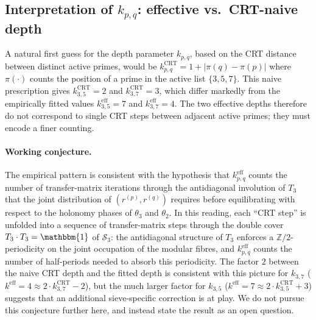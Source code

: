 \subsection{Interpretation of $k_{p,q}$: effective vs.\ CRT-naive depth}
\label{ssec:k_interpretation}

A natural first guess for the depth parameter $k_{p,q}$, based on the
CRT distance between distinct active primes, would be
$k^{\mathrm{CRT}}_{p,q} = 1 + |\pi(q) - \pi(p)|$ where
$\pi(\cdot)$ counts the position of a prime in the active list
$\{3, 5, 7\}$. This naive prescription gives
$k_{3,5}^{\mathrm{CRT}} = 2$ and $k_{3,7}^{\mathrm{CRT}} = 3$,
which differ markedly from the empirically fitted values
$k_{3,5}^{\mathrm{eff}} = 7$ and $k_{3,7}^{\mathrm{eff}} = 4$. The
two effective depths therefore do not correspond to single CRT steps
between adjacent active primes; they must encode a finer counting.

\paragraph{Working conjecture.}
The empirical pattern is consistent with the hypothesis that
$k_{p,q}^{\mathrm{eff}}$ counts the number of transfer-matrix
iterations through the antidiagonal involution of $T_3$ that the
joint distribution of $(r^{(p)}, r^{(q)})$ requires before
equilibrating with respect to the holonomy phases of $\theta_3$ and
$\theta_2$. In this reading, each ``CRT step'' is unfolded into a
sequence of transfer-matrix steps through the double cover
$T_3 \cdot T_3 = \mathbbm{1}$ of $\mathcal{S}_3$: the antidiagonal
structure of $T_3$ enforces a $\mathbb{Z}/2$-periodicity on the
joint occupation of the modular fibres, and $k_{p,q}^{\mathrm{eff}}$
counts the number of half-periods needed to absorb this
periodicity. The factor $2$ between the naive CRT depth and the
fitted depth is consistent with this picture for $k_{3,7}$
($k^{\mathrm{eff}} = 4 \approx 2 \cdot k^{\mathrm{CRT}}_{3,7} - 2$),
but the much larger factor for $k_{3,5}$
($k^{\mathrm{eff}} = 7 \approx 2 \cdot k^{\mathrm{CRT}}_{3,5} + 3$)
suggests that an additional sieve-specific correction is at play. We
do not pursue this conjecture further here, and instead state the
result as an open question.

